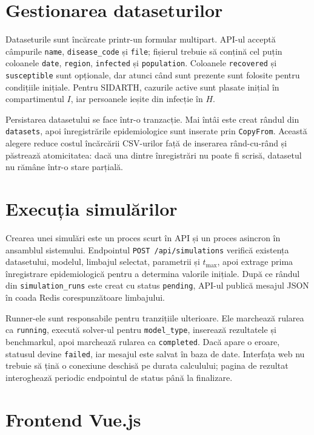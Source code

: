\section{Gestionarea dataseturilor}
\label{sec:dataseturi_web}

Dataseturile sunt încărcate printr-un formular multipart. API-ul acceptă câmpurile
\texttt{name}, \texttt{disease\_code} și \texttt{file}; fișierul trebuie să conțină
cel puțin coloanele \texttt{date}, \texttt{region}, \texttt{infected} și
\texttt{population}. Coloanele \texttt{recovered} și \texttt{susceptible} sunt
opționale, dar atunci când sunt prezente sunt folosite pentru condițiile inițiale.
Pentru SIDARTH, cazurile active sunt plasate inițial în compartimentul $I$, iar
persoanele ieșite din infecție în $H$.

Persistarea datasetului se face într-o tranzacție. Mai întâi este creat rândul din
\texttt{datasets}, apoi înregistrările epidemiologice sunt inserate prin
\texttt{CopyFrom}. Această alegere reduce costul încărcării CSV-urilor față de
inserarea rând-cu-rând și păstrează atomicitatea: dacă una dintre înregistrări nu
poate fi scrisă, datasetul nu rămâne într-o stare parțială.

\section{Execuția simulărilor}
\label{sec:executie_simulari_web}

Crearea unei simulări este un proces scurt în API și un proces asincron în
ansamblul sistemului. Endpointul \texttt{POST /api/simulations} verifică existența
datasetului, modelul, limbajul selectat, parametrii și $t_{\max}$, apoi extrage
prima înregistrare epidemiologică pentru a determina valorile inițiale. După ce
rândul din \texttt{simulation\_runs} este creat cu status \texttt{pending}, API-ul
publică mesajul JSON în coada Redis corespunzătoare limbajului.

Runner-ele sunt responsabile pentru tranzițiile ulterioare. Ele marchează rularea
ca \texttt{running}, execută solver-ul pentru \texttt{model\_type}, inserează
rezultatele și benchmarkul, apoi marchează rularea ca \texttt{completed}. Dacă
apare o eroare, statusul devine \texttt{failed}, iar mesajul este salvat în baza de
date. Interfața web nu trebuie să țină o conexiune deschisă pe durata calculului;
pagina de rezultat interoghează periodic endpointul de status până la finalizare.

\section{Frontend Vue.js}
\label{sec:frontend_vue}

